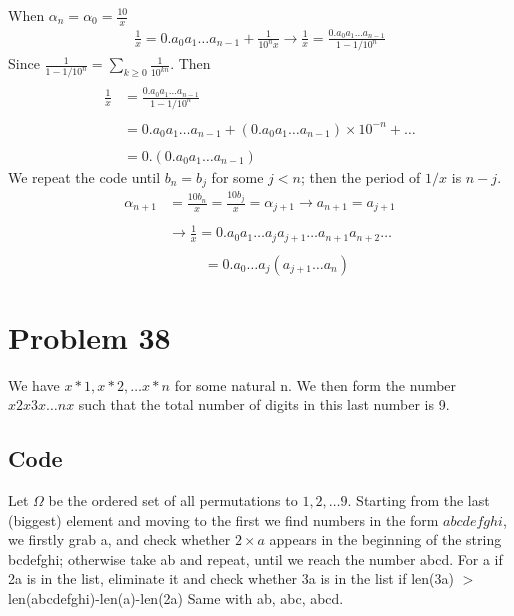 \documentclass[12pt]{article}
\begin{document}
When $\alpha_n = \alpha_0 = \frac{10}{x}$
\begin{align*}
    \frac{1}{x} = 0.a_0a_1\ldots a_{n-1} + \frac{1}{10^n x} \rightarrow \frac{1}{x} = \frac{0.a_0a_1\ldots a_{n-1}}{1-1/10^n}
\end{align*}
Since $\frac{1}{1-1/10^n} = \sum_{k \geq 0} \frac{1}{10^{kn}}$. Then
\begin{align*}
    \\ \frac{1}{x} &= \frac{0.a_0a_1\ldots a_{n-1}}{1-1/10^n} \\\\
    &= 0.a_0a_1\ldots a_{n-1} + (0.a_0a_1\ldots a_{n-1}) \times 10^{-n} + \ldots \\\\
    &= 0.(0.a_0a_1\ldots a_{n-1})
\end{align*}
We repeat the code until $b_n = b_j$ for some $j < n$; then the period of $1/x$ is $n-j$.
\begin{align*}
    \alpha_{n+1} &= \frac{10b_n}{x} = \frac{10b_j}{x} = \alpha_{j+1} \rightarrow a_{n+1} = a_{j+1} \\\\
    & \rightarrow \frac{1}{x} = 0.a_0a_1\ldots a_ja_{j+1} \ldots a_{n+1}a_{n+2}\ldots \\\\
    & \qquad \; \; =0.a_0\ldots a_j(a_{j+1}\ldots a_n)
\end{align*}

\section*{Problem 38}
We have $x*1, x*2, \ldots x*n$ for some natural n. We then form the number $x2x3x\ldots nx$ such that the total number of digits in this last number is 9.
\subsection{Code}
Let $\Omega$ be the ordered set of all permutations to $1, 2,\ldots 9$. Starting from the last (biggest) element and moving to the first we find numbers in the form $abcdefghi$, we firstly grab a, and check whether $2\times a$ appears in the beginning of the string bcdefghi; otherwise take ab and repeat, until we reach the number abcd.
For a if 2a is in the list, eliminate it and check whether 3a is in the list if len(3a) $>$ len(abcdefghi)-len(a)-len(2a)
Same with ab, abc, abcd.
\end{document}
